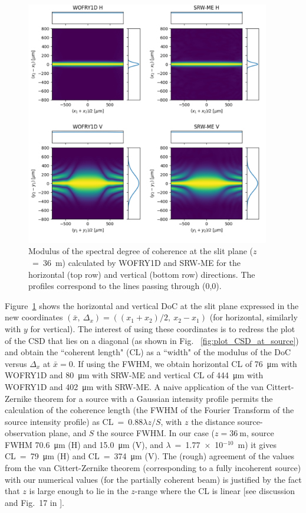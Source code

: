 \documentclass[preprint]{iucr}
\newcommand{\inred}[1]{{\color{red}#1}}
\begin{document}
\begin{figure}
    \label{fig:plot_DoC_at_36m}
    \includegraphics[width=0.95\textwidth]{figures/plot_DoC_at_36m.pdf}
    \caption{Modulus of the spectral degree of coherence at the slit plane ($z$~=~\SI{36}{\meter}) calculated by WOFRY1D and SRW-ME for the horizontal (top row) and vertical (bottom row) directions.
    The profiles correspond to the lines passing through (0,0).
    }
\end{figure}

Figure~\ref{fig:plot_DoC_at_36m} shows the horizontal and vertical DoC at the slit plane expressed in the new coordinates $(\bar{x},~\Delta_x) = ((x_1+x_2)\big/2,~x_2-x_1)$ (for horizontal, similarly with $y$ for vertical). The interest of using these coordinates is to redress the plot of the CSD that lies on a diagonal (as shown in Fig. ~\ref{fig:plot_CSD_at_source}) and obtain the ``coherent length" (CL) as a ``width" of the modulus of the DoC versus $\Delta_x$ at $\bar{x}=0$. If using the FWHM, we obtain horizontal CL of \SI{76}{\micro\meter} with WOFRY1D and \SI{80}{\micro\meter} with SRW-ME and vertical CL of
\SI{444}{\micro\meter} with WOFRY1D and \SI{402}{\micro\meter} with SRW-ME. A naive application of the van Cittert-Zernike theorem for a source with a Gaussian intensity profile permits t\inred{he} calculat\inred{ion} \inred{of} the coherence length (the FWHM of the Fourier Transform of the source intensity profile) as CL~=~0.88$\lambda z/S$, with $z$ the distance source-observation plane, and $S$ the source FWHM. In our case ($z=\SI{36}{\meter}$, source FWHM \SI{70.6}{\micro\meter} (H) and \SI{15.0}{\micro\meter} (V), and $\lambda$~=~1.77~$\times$~10$^{-10}$~m) it gives CL~=~\SI{79}{\micro\meter} (H) and CL~=~\SI{374}{\micro\meter} (V). The (rough) agreement of the values from the van Cittert-Zernike theorem (corresponding to a fully incoherent source) with our numerical values (for the partial\inred{ly} coherent beam) is justified by the fact that $z$ is large enough to lie in the $z$-range where the CL is linear [see discussion and Fig.~17 in \cite{geloni2008}].
\end{document}
